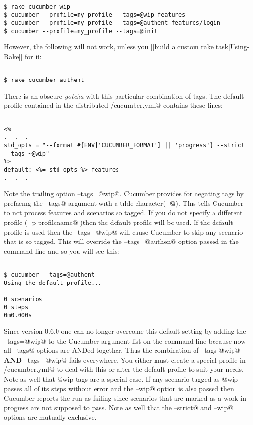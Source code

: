 \begin{verbatim}

$ rake cucumber:wip
$ cucumber --profile=my_profile --tags=@wip features
$ cucumber --profile=my_profile --tags=@authent features/login
$ cucumber --profile=my_profile --tags=@init 

\end{verbatim}
However, the following will not work, unless you [[build a custom rake task|Using-Rake]] for it:

\begin{verbatim}

$ rake cucumber:authent

\end{verbatim}
There is an obscure \emph{gotcha} with this particular combination of tags.  The default profile contained in the distributed \verb@config/cucumber.yml@ contains these lines:

\begin{verbatim}

<%
.  .  .
std_opts = "--format #{ENV['CUCUMBER_FORMAT'] || 'progress'} --strict --tags ~@wip"
%>
default: <%= std_opts %> features
.  .  .

\end{verbatim}
Note the trailing option \verb@--tags ~@wip@.  Cucumber provides for negating tags by prefacing the \verb@--tags@ argument with a tilde character(\textbf{\verb@~@}).  This tells Cucumber to not process features and scenarios so tagged. If you do not specify a different profile ( \verb@cucumber -p profilename@ )then the default profile will be used.  If the default profile is used then the \verb@--tags ~@wip@ will cause Cucumber to skip any scenario that is so tagged.  This will override the \verb@--tags=@authen@ option passed in the command line and so you will see this:

\begin{verbatim}

$ cucumber --tags=@authent
Using the default profile...

0 scenarios
0 steps
0m0.000s

\end{verbatim}
Since version 0.6.0 one can no longer overcome this default setting by adding the \verb@--tags=@wip@ to the Cucumber argument list on the command line because now all \verb@--tags@ options are ANDed together.  Thus the combination of \verb@--tags @wip@ \textbf{AND} \verb@--tags ~@wip@ fails everywhere.  You either must create a special profile in \verb@config/cucumber.yml@ to deal with this or alter the default profile to suit your needs.  Note as well that @wip tags are a special case. If any scenario tagged as @wip passes all of its steps without error and the \verb@--wip@ option is also passed then Cucumber reports the run as failing since scenarios that are marked as a work in progress are not supposed to pass.  Note as well that the \verb@--strict@ and \verb@--wip@ options are mutually exclusive.

